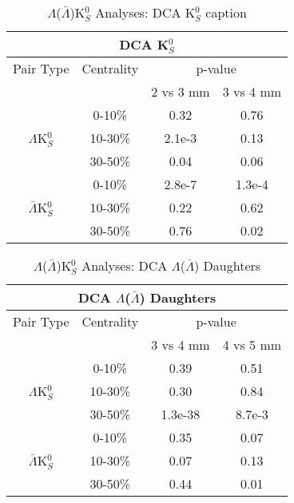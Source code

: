 \documentclass[../AnalysisNoteJBuxton.tex]{subfiles}
\begin{document}
\begin{table}
 \centering
 \begin{tabular}{|c|c|c|c|}
  \multicolumn{4}{c}{DCA K$^{0}_{S}$} \\
  \hline
  Pair Type & Centrality & \multicolumn{2}{c|}{p-value} \\
  \cline{3-4}
   & & 2 vs 3 mm & 3 vs 4 mm \\
  \hline
   & 0-10\% & 0.32 & 0.76 \\
  $\Lambda$K$^{0}_{S}$ 
   & 10-30\% & 2.1e-3 & 0.13 \\
   & 30-50\% & 0.04 & 0.06 \\
  \hline
   & 0-10\% & 2.8e-7 & 1.3e-4 \\
  $\bar{\Lambda}$K$^{0}_{S}$ 
   & 10-30\% & 0.22 & 0.62 \\
   & 30-50\% & 0.76 & 0.02 \\
  \hline
 \end{tabular}
 \caption{$\Lambda$($\bar{\Lambda}$)K$^{0}_{S}$ Analyses: DCA K$^{0}_{S}$ caption}
 \label{tab:K0DcaLamK0}
\end{table}

\begin{table}
 \centering
 \begin{tabular}{|c|c|c|c|}
 \multicolumn{4}{c}{DCA $\Lambda$($\bar{\Lambda}$) Daughters} \\
  \hline
  Pair Type & Centrality & \multicolumn{2}{c|}{p-value} \\
  \cline{3-4}
   & & 3 vs 4 mm & 4 vs 5 mm \\
  \hline
   & 0-10\% & 0.39 & 0.51 \\
  $\Lambda$K$^{0}_{S}$ 
   & 10-30\% & 0.30 & 0.84 \\
   & 30-50\% & 1.3e-38 & 8.7e-3 \\
  \hline
   & 0-10\% & 0.35 & 0.07 \\
  $\bar{\Lambda}$K$^{0}_{S}$ 
   & 10-30\% & 0.07 & 0.13 \\
   & 30-50\% & 0.44 & 0.01 \\
  \hline
 \end{tabular}
 \caption{$\Lambda$($\bar{\Lambda}$)K$^{0}_{S}$ Analyses: DCA $\Lambda$($\bar{\Lambda}$) Daughters}
 \label{tab:LamDaughtersDcaLamK0}
\end{table}
\end{document}
